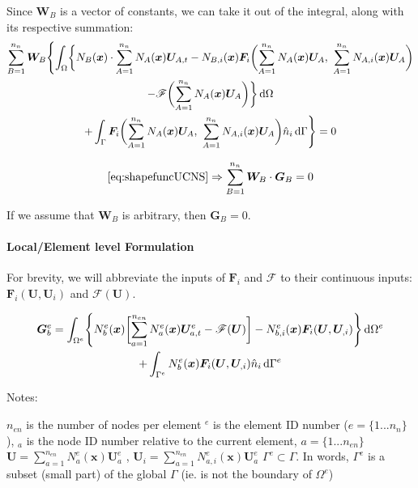 \documentclass[11pt, letterpaper, twoside]{article}
\renewcommand{\vec}[1]{\bm{#1}}
\newcommand{\U}{\vec{U}}
\newcommand{\G}{\vec{G}}
\newcommand{\F}{\vec{F}}
\newcommand{\W}{\vec{W}}
\newcommand{\x}{\vec{x}}
\newcommand{\NAx}{N_A(\x)}
\newcommand{\NBx}{N_B(\x)}
\newcommand{\NAix}{N_{A,i}(\x)}
\newcommand{\NBix}{N_{B,i}(\x)}
\newcommand{\Neax}{N^e_a(\x)}
\newcommand{\Nebx}{N^e_b(\x)}
\newcommand{\Neaix}{N^e_{a,i}(\x)}
\newcommand{\Nebix}{N^e_{b,i}(\x)}
\newcommand{\sumA}[1]{\sum_{A=1}^{#1}}
\newcommand{\sumB}[1]{\sum_{B=1}^{#1}}
\newcommand{\suma}[1]{\sum_{a=1}^{#1}}
\newcommand{\src}{\vec{\mathscr{F}}}
\begin{document}
            Since \(\W_B\) is a vector of constants, we can take it out of the integral, along with its respective summation:
            \begin{multline} \label{eq:shapefuncUCNS}
                \sumB{n_n} \W_B  \Biggl\{\int_\Omega \biggl\{  \NBx  \cdot \sumA{n_n} \NAx \U_{A,t} 
                -  \NBix  \F_i \biggl(\sumA{n_n} \NAx \U_A,\ \sumA{n_n} \NAix \U_A\biggr) \\
                -   \src\biggl(\sumA{n_n} \NAx \U_A \biggr) \biggr\} \dif \Omega \\
                + \int_\Gamma \F_i\biggl(\sumA{n_n} \NAx \U_A,\ \sumA{n_n} \NAix \U_A\biggr) \hat n_i \dif \Gamma \Biggr\} = 0
            \end{multline}

            \begin{equation}
                \cref{eq:shapefuncUCNS} \Rightarrow \sumB{n_n} \W_B \cdot \G_B = 0
            \end{equation}

            If we assume that \(\W_B\) is arbitrary, then \(\G_B=0\).

        \paragraph{Local/Element level Formulation}
            For brevity, we will abbreviate the inputs of \(\F_i\) and \(\src\) to their continuous inputs: \(\F_i(\U, \U_i)\) and \(\src(\U)\).

            \begin{multline} 
                \G_b^e = \int_{\Omega^e} \Biggl\{ \Nebx \biggl[ \suma{n_{en}} \Neax \U_{a,t}^e - \src(\U) \biggr] - \Nebix \F_i(\U, \U_{,i}) \Biggr\} \dif \Omega^e \\
                + \int_{\Gamma^e} \Nebx \F_i(\U, \U_{,i}) \hat n_i \dif \Gamma^e
            \end{multline}

            Notes:
            \begin{outline}[enumerate]
                \1 \(n_{en}\) is the number of nodes per element
                \1 \(^e\) is the element ID number (\(e = \{1 ... n_n\}\)), 
                \1 \(_a\) is the node ID number relative to the current element, \(a = \{1 ... n_{en}\}\)
                \1 \(\U = \suma{n_{en}} \Neax \U_a^e\) , \(\U_i = \suma{n_{en}} \Neaix \U_a^e\)
                \1 \(\Gamma^e \subset \Gamma \). In words, \(\Gamma^e\) is a subset (small part) of the global \(\Gamma\) (ie. is not the boundary of \(\Omega^e\))
                
            \end{outline}
\end{document}
